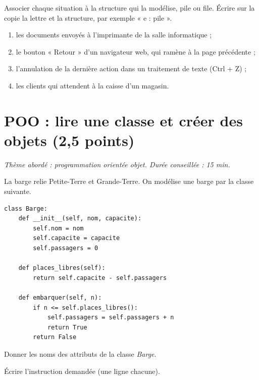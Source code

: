 \documentclass[a4paper, noanswers, addpoints, 12pt]{exam}
\begin{document}
\begin{questions}
\question[1] Associer chaque situation à la structure qui la modélise, pile ou file. Écrire sur la copie la lettre et la structure, par exemple « e : pile ».
\begin{enumerate}[label=\alph*), itemsep=0pt, topsep=2pt]
\item les documents envoyés à l'imprimante de la salle informatique ;
\item le bouton « Retour » d'un navigateur web, qui ramène à la page précédente ;
\item l'annulation de la dernière action dans un traitement de texte (Ctrl + Z) ;
\item les clients qui attendent à la caisse d'un magasin.
\end{enumerate}

\section{POO : lire une classe et créer des objets (2,5 points)}
\begin{center}\textit{Thème abordé : programmation orientée objet. Durée conseillée : 15 min.}\end{center}

La barge relie Petite-Terre et Grande-Terre. On modélise une barge par la classe suivante.
\par\noindent\begin{minipage}{\linewidth}
\begin{lstlisting}[basicstyle=\ttfamily\footnotesize]
class Barge:
    def __init__(self, nom, capacite):
        self.nom = nom
        self.capacite = capacite
        self.passagers = 0

    def places_libres(self):
        return self.capacite - self.passagers

    def embarquer(self, n):
        if n <= self.places_libres():
            self.passagers = self.passagers + n
            return True
        return False
\end{lstlisting}
\end{minipage}\par

\question[\half] Donner les noms des attributs de la classe \textit{Barge}.

\question Écrire l'instruction demandée (une ligne chacune).
\begin{parts}

\end{parts}
\end{questions}
\end{document}

